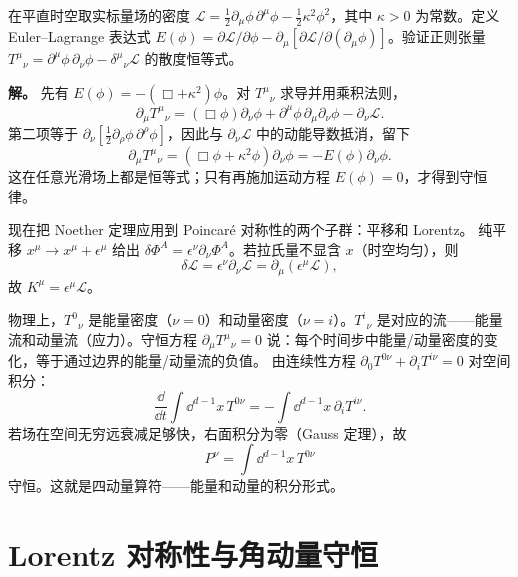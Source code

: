 \begin{workedexample}[平移不变性与应力能量守恒]
在平直时空取实标量场的密度 \(\mathcal L=\tfrac12\partial_\mu\phi\,\partial^\mu\phi-\tfrac12\kappa^2\phi^2\)，其中 \(\kappa>0\) 为常数。定义 Euler--Lagrange 表达式 \(E(\phi)=\partial\mathcal L/\partial\phi-\partial_\mu[\partial\mathcal L/\partial(\partial_\mu\phi)]\)。验证正则张量 \(T^\mu{}_\nu=\partial^\mu\phi\,\partial_\nu\phi-\delta^\mu{}_\nu\mathcal L\) 的散度恒等式。

\textbf{解。} 先有 \(E(\phi)=-(\Box+\kappa^2)\phi\)。对 \(T^\mu{}_\nu\) 求导并用乘积法则，
\[
\partial_\mu T^\mu{}_\nu
=(\Box\phi)\partial_\nu\phi
+\partial^\mu\phi\,\partial_\mu\partial_\nu\phi
-\partial_\nu\mathcal L.
\]
第二项等于 \(\partial_\nu[\tfrac12\partial_\rho\phi\,\partial^\rho\phi]\)，因此与 \(\partial_\nu\mathcal L\) 中的动能导数抵消，留下
\[
\partial_\mu T^\mu{}_\nu
=(\Box\phi+\kappa^2\phi)\partial_\nu\phi
=-E(\phi)\partial_\nu\phi.
\]
这在任意光滑场上都是恒等式；只有再施加运动方程 \(E(\phi)=0\)，才得到守恒律。

\end{workedexample}


现在把 Noether 定理应用到 Poincaré 对称性的两个子群：平移和 Lorentz。
纯平移 $x^\mu\to x^\mu+\epsilon^\mu$ 给出 $\delta\Phi^A=\epsilon^\nu\partial_\nu\Phi^A$。若拉氏量不显含 $x$（时空均匀），则
\begin{equation*}
\delta\mathcal{L}=\epsilon^\nu\partial_\nu\mathcal{L}=\partial_\mu(\epsilon^\mu\mathcal{L}),
\end{equation*}
故 $K^\mu=\epsilon^\mu\mathcal{L}$。

物理上，$T^{0}{}_\nu$ 是能量密度（$\nu=0$）和动量密度（$\nu=i$）。$T^{i}{}_\nu$ 是对应的流——能量流和动量流（应力）。守恒方程 $\partial_\mu T^\mu{}_\nu=0$ 说：每个时间步中能量/动量密度的变化，等于通过边界的能量/动量流的负值。
由连续性方程 $\partial_0 T^{0\nu}+\partial_i T^{i\nu}=0$ 对空间积分：
\begin{equation*}
\frac{\dd}{\dd t}\int \dd^{d-1}x\,T^{0\nu}=-\int \dd^{d-1}x\,\partial_i T^{i\nu}.
\end{equation*}
若场在空间无穷远衰减足够快，右面积分为零（Gauss 定理），故
\begin{equation*}{P^\nu=\int \dd^{d-1}x\,T^{0\nu}}
\end{equation*}
守恒。这就是四动量算符——能量和动量的积分形式。

\section{Lorentz 对称性与角动量守恒}

